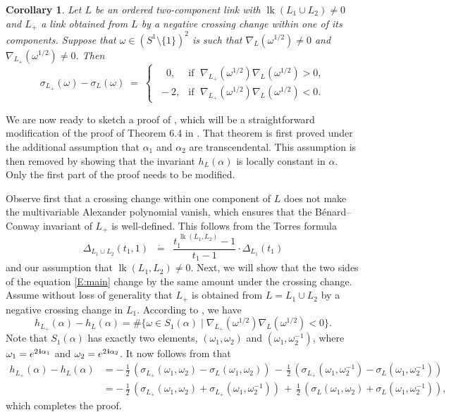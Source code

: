 \documentclass[11pt,reqno]{amsart}
\newtheorem{corollary}[theorem]{Corollary}
\theoremstyle{definition}
\renewcommand{\i}{\mspace{1.5mu}\mathbf i}
\newcommand{\lk}{\operatorname{lk}}
\begin{document}
\begin{sloppypar}
\begin{corollary}
Let $L$ be an ordered two-component link with $\lk(L_1\cup L_2) \neq 0$ and $L_+$ a link obtained from $L$ by a negative crossing change within one of its components. Suppose that $\omega \in (S^1 \setminus \lbrace 1 \rbrace)^2$ is such that $\nabla_L(\omega^{1/2}) \ne 0$ and $\nabla_{L_+}(\omega^{1/2}) \ne 0$. Then
\[
\sigma_{L_+}(\omega) - \sigma_L(\omega)\; =\; \begin{cases} \quad 0, & \text{if }\; \nabla_{L_+}(\omega^{1 / 2}) \nabla_L(\omega^{1 / 2}) > 0 , \\ \; - 2, & \text{if }\; \nabla_{L_+}(\omega^{1 / 2}) \nabla_L(\omega^{1 / 2}) < 0 . \end{cases}
\]
\end{corollary}

We are now ready to sketch a proof of , which will be a straightforward modification of the proof of Theorem 6.4 in \cite{Benard-Conway}. That theorem is first proved under the additional assumption that $\alpha_1$ and $\alpha_2$ are transcendental. This assumption is then removed by showing that the invariant $h_L (\alpha)$ is locally constant in $\alpha$. Only the first part of the proof needs to be modified.

Observe first that a crossing change within one component of $L$ does not make the multivariable Alexander polynomial vanish, which ensures that the B{\'e}nard--Conway invariant of $L_+$ is well-defined. This follows from the Torres formula \cite{Torres}
\[
\Delta_{L_1\cup L_2} (t_1,1)\;\; \dot{=}\;\; \frac{t_1^{\,\lk(L_1,L_2)} - 1}{t_1 - 1} \cdot \Delta_{L_1} (t_1)
\]
and our assumption that $\lk (L_1,L_2) \neq 0$. Next, we will show that the two sides of the equation \eqref{E:main} change by the same amount under the crossing change. Assume without loss of generality that $L_+$ is obtained from $L = L_1 \cup L_2$ by a negative crossing change in $L_1$. According to , we have
\[
h_{L_+}(\alpha) - h_L(\alpha) = \# \big\lbrace \omega \in S_1(\alpha) \; \big| \; \nabla_{L_+}(\omega^{1 / 2}) \nabla_L(\omega^{1 / 2}) < 0\big\rbrace.
\]
Note that $S_1(\alpha)$ has exactly two elements, $(\omega_1, \omega_2)$ and $(\omega_1, \omega_2^{-1})$, where $\omega_1 = e^{2\i\alpha_1}$ and $\omega_2 = e^{2\i\alpha_2}$. It now follows from  that
\[
\begin{aligned}
h_{L_+}(\alpha) - h_L(\alpha) &= -\, \frac{1}{2}\,(\sigma_{L_+}(\omega_1, \omega_2) - \sigma_L(\omega_1, \omega_2))\, -\, \frac{1}{2}\,(\sigma_{L_+}(\omega_1, \omega_2^{-1}) - \sigma_L(\omega_1, \omega_2^{-1})) \\ &= -\, \frac{1}{2}\,(\sigma_{L_+}(\omega_1, \omega_2)+\sigma_{L_+}(\omega_1, \omega_2^{-1}))\, +\, \frac{1}{2}\,(\sigma_L(\omega_1, \omega_2)+\sigma_L(\omega_1, \omega_2^{-1})),
\end{aligned}
\]
which completes the proof. 


\end{sloppypar}
\end{document}
